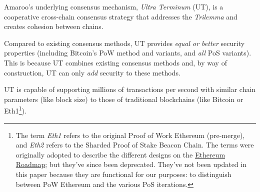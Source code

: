 Amaroo's underlying consensus mechanism, \emph{Ultra Terminum} (UT), is a cooperative cross-chain consensus strategy that addresses the \emph{Trilemma} and creates cohesion between chains.

Compared to existing consensus methods, UT provides \emph{equal or better} security properties
(including Bitcoin's PoW method and variants, and \emph{all} PoS variants).
This is because UT combines existing consensus methods and, by way of construction, UT can only \emph{add} security to these methods.

UT is capable of supporting millions of transactions per second with similar chain parameters (like block size) to those of traditional blockchains (like Bitcoin or Eth1\footnote{
    The term \emph{Eth1} refers to the original Proof of Work Ethereum (pre-merge), and \emph{Eth2} refers to the Sharded Proof of Stake Beacon Chain.
    The terms were originally adopted to describe the different designs on the \href{https://web.archive.org/web/20241128055038/https://ethereum.org/en/roadmap/}{Ethereum Roadmap}; but they've since been deprecated.
    They've not been updated in this paper because they are functional for our purposes: to distinguish between PoW Ethereum and the various PoS iterations.
}).
